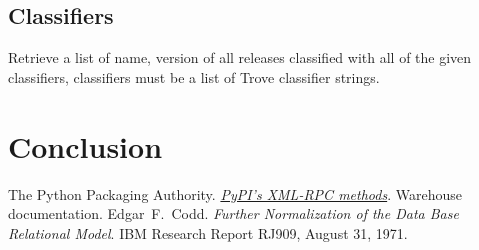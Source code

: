 \documentclass[a4paper,12pt]{article}
\begin{document}
\subsection{Classifiers}
Retrieve a list of name, version of all releases classified with all of the given classifiers, classifiers must be a list of Trove classifier strings.
\section{Conclusion}

\begin{thebibliography}{69}
   The Python Packaging Authority.
    \href{https://warehouse.readthedocs.io/api-reference/xml-rpc}
         {\emph{PyPI’s XML-RPC methods}}.
    Warehouse documentation.
   Edgar~F.~Codd.
    \emph{Further Normalization of the Data Base Relational Model}.
    IBM Research Report RJ909, August 31, 1971.
\end{thebibliography}
\end{document}
